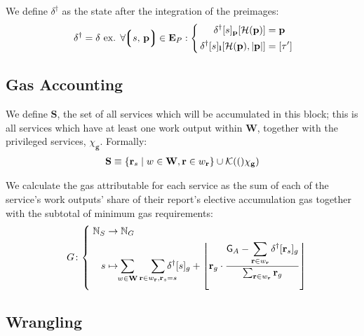 We define $\delta^\dagger$ as the state after the integration of the preimages:
\begin{align}
    \delta^\dagger = \delta \text{ ex. } \forall \tup{s\ts\mathbf{p}} \in \xtpreimages : \left\{\,\begin{aligned}
      \quad\delta^\dagger[s]_\mathbf{p}[\mathcal{H}(\mathbf{p})] &= \mathbf{p} \\
      \delta^\dagger[s]_\mathbf{l}[\mathcal{H}(\mathbf{p}), |\mathbf{p}|] &= [\tau']
    \end{aligned}\right.\!\!
\end{align}



\subsection{Gas Accounting}

We define $\mathbf{S}$, the set of all services which will be accumulated in this block; this is all services which have at least one work output within $\mathbf{W}$, together with the privileged services, $\chi_\mathbf{g}$. Formally:
\begin{align}\label{eq:servicestoaccumulate}
  \mathbf{S} \equiv \{ \mathbf{r}_s \mid w \in \mathbf{W}, \mathbf{r} \in w_\mathbf{r} \} \cup \mathcal{K}(()\chi_\mathbf{g})
\end{align}

We calculate the gas attributable for each service as the sum of each of the service's work outputs' share of their report's elective accumulation gas together with the subtotal of minimum gas requirements:
\begin{equation}
  G\colon\left\{\;\begin{aligned}
    \N_S &\to \N_G \\
    \displaystyle s &\mapsto \!\!\sum_{w \in \mathbf{W}}\sum_{\mathbf{r} \in w_\mathbf{r} , \mathbf{r}_s = s}{\!\!\!\!\!\!\!\delta^\dagger[s]_g + \left \lfloor \mathbf{r}_g\cdot\frac{\displaystyle \mathsf{G}_A - \sum_{\mathbf{r} \in w_\mathbf{r}}{\delta^\dagger[\mathbf{r}_s]_g}}{\sum_{\mathbf{r} \in w_\mathbf{r}}{\mathbf{r}_g}} \right \rfloor }
  \end{aligned}\right.\!\!\!\!\!\!
\end{equation}

\subsection{Wrangling}

